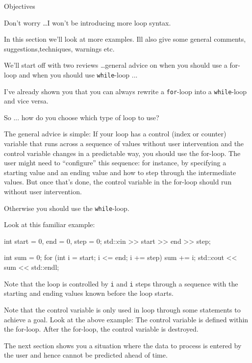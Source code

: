 \newpage{}

Objectives

Don't worry \ldots I won't be
introducing more loop syntax.

In this section we'll look at more examples.
Ill also give some general comments, suggestions,techniques, warnings etc.

We'll start off with two reviews \ldots general advice
on when you should use a for-loop and when you should use \texttt{while}-loop ...

\newpage{}

I've already shown you that you can always rewrite a \texttt{for}-loop into a \texttt{while}-loop and vice versa.

So ... how do you choose which type of loop to use?

The general advice is simple: If your loop has a control (index or
counter) variable that runs across a sequence of values without user
intervention and the control variable changes in a predictable way, you
should use the for-loop. The user might need to ``configure'' this
sequence: for instance, by specifying a starting value and an ending
value and how to step through the intermediate values. But once
that's done, the control variable in the for-loop should
run without user intervention.

Otherwise you should use the \texttt{while}-loop.

Look at this familiar example:
\begin{console}
int start = 0, end = 0, step = 0;
std::cin >> start >> end >> step;

int sum = 0;
for (int i = start; i <= end; i += step)
{   
    sum += i;
}
std::cout << sum << std::endl; 
\end{console}

Note that the loop is controlled by \texttt{i} and \texttt{i} steps through
a sequence with the starting and ending values known before the loop
starts.

Note that the control variable is only used in loop through some
statements to achieve a goal. Look at the above example: The control
variable is defined within the for-loop. After the for-loop, the control
variable is destroyed.

The next section shows you a situation where the data to process is
entered by the user and hence cannot be predicted ahead of time.

\newpage{}

